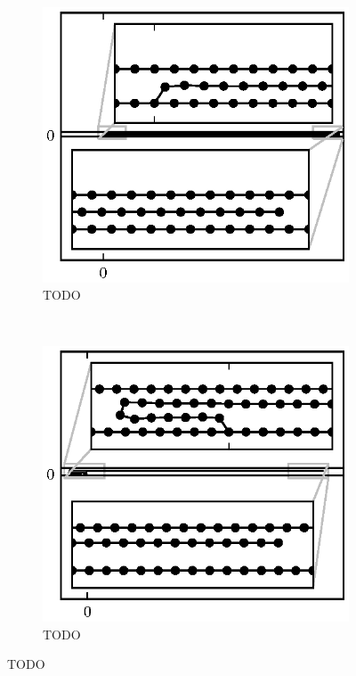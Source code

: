 	\begin{figure}
		\centering
		\begin{subfigure}{.5\textwidth}
			\centering
			\includegraphics{./fig/ch3/push/ref/l5_m10.eps}
			\caption{TODO\label{subfig:push_squished}}
		\end{subfigure}%
		~
		\begin{subfigure}{.5\textwidth}
			\centering
			\includegraphics{./fig/ch3/push/ref/l14_m10.5.eps}
			\caption{TODO \label{subfig:push_one_fold}}
		\end{subfigure}


\end{figure}
